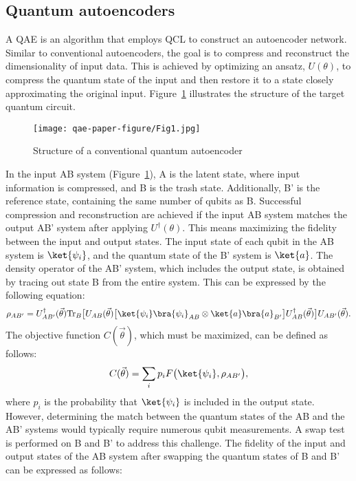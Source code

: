 \subsection{Quantum autoencoders}
A QAE is an algorithm that employs QCL to construct an autoencoder network\citep{Romero_2017}. Similar to conventional autoencoders, the goal is to compress and reconstruct the dimensionality of input data. This is achieved by optimizing an ansatz, $U(\theta)$, to compress the quantum state of the input and then restore it to a state closely approximating the original input. Figure~\ref{fig:QAE_before_swap} illustrates the structure of the target quantum circuit.
\begin{figure}[t]
\centering
\texttt{[image: qae-paper-figure/Fig1.jpg]}
\caption{Structure of a conventional quantum autoencoder}\label{fig:QAE_before_swap}
\end{figure}
In the input AB system (Figure~\ref{fig:QAE_before_swap}), A is the latent state, where input information is compressed, and B is the trash state. Additionally, B' is the reference state, containing the same number of qubits as B. Successful compression and reconstruction are achieved if the input AB system matches the output AB' system after applying $U^\dagger(\theta)$. This means maximizing the fidelity between the input and output states. The input state of each qubit in the AB system is $\ket{\psi_i}$, and the quantum state of the B' system is $\ket{a}$. The density operator of the AB' system, which includes the output state, is obtained by tracing out state B from the entire system. This can be expressed by the following equation:
\begin{equation}
\rho_{AB'} = U_{AB'}^\dagger(\vec{\theta}) \mathrm{Tr}_B \big[ U_{AB}(\vec{\theta}) \big[ \ket{\psi_i} \bra{\psi_i}_{AB} \otimes \ket{a} \bra{a}_{B'} \big] U_{AB}^\dagger(\vec{\theta}) \big] U_{AB'}(\vec{\theta}). \label{eq:rho_AB'}
\end{equation}
The objective function $C(\vec{\theta})$, which must be maximized, can be defined as follows:
\begin{equation}
C(\vec{\theta}) = \sum_i p_i F \big(\ket{\psi_i}, \rho_{AB'} \big), \label{eq:C1}
\end{equation}
where $p_i$ is the probability that $\ket{\psi_i}$ is included in the output state.
However, determining the match between the quantum states of the AB and the AB' systems would typically require numerous qubit measurements. A swap test is performed on B and B' to address this challenge. The fidelity of the input and output states of the AB system after swapping the quantum states of B and B' can be expressed as follows:
